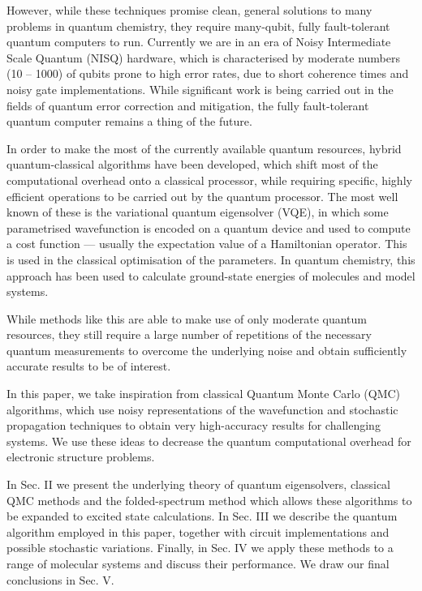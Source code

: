 \documentclass[%
 reprint,
 amsmath,amssymb,
 aps,
]{revtex4-2}
\begin{document}
However, while these techniques promise clean, general solutions to many problems in quantum chemistry, they require many-qubit, fully fault-tolerant quantum computers to run. Currently we are in an era of Noisy Intermediate Scale Quantum (NISQ) hardware,\cite{Preskill2018} which is characterised by moderate numbers (10 -- 1000) of qubits prone to high error rates, due to short coherence times and noisy gate implementations.\cite{Linke2017} While significant work is being carried out in the fields of quantum error correction\cite{Georgescu2020} and mitigation, \cite{Cai2022} the fully fault-tolerant quantum computer remains a thing of the future.

In order to make the most of the currently available quantum resources, hybrid quantum-classical algorithms\cite{Farhi2014, Peruzzo2014, Colless2018, Higgott2019, Nakanishi2019, Greene-Diniz2021, Smart2021} have been developed, which shift most of the computational overhead onto a classical processor, while requiring specific, highly efficient operations to be carried out by the quantum processor. The most well known of these is the variational quantum eigensolver (VQE),\cite{Peruzzo2014} in which some parametrised wavefunction is encoded on a quantum device and used to compute a cost function --- usually the expectation value of a Hamiltonian operator. This is used in the classical optimisation of the parameters. In quantum chemistry, this approach has been used to calculate ground-state energies of molecules and model systems.\cite{Peruzzo2014, Shen2017, Hempel2018} 

While methods like this are able to make use of only moderate quantum resources, they still require a large number of repetitions of the necessary quantum measurements to overcome the underlying noise and obtain sufficiently accurate results to be of interest. 

In this paper, we take inspiration from classical Quantum Monte Carlo (QMC) algorithms,\cite{Booth2009, Thom2010, Filip2020} which use noisy representations of the wavefunction and stochastic propagation techniques to obtain very high-accuracy results for challenging systems. We use these ideas to decrease the quantum computational overhead for electronic structure problems.

In Sec. II we present the underlying theory of quantum eigensolvers, classical QMC methods and the folded-spectrum method which allows these algorithms to be expanded to excited state calculations. In Sec. III we describe the quantum algorithm employed in this paper, together with circuit implementations and possible stochastic variations. Finally, in Sec. IV we apply these methods to a range of molecular systems and discuss their performance. We draw our final conclusions in Sec. V.
\end{document}
